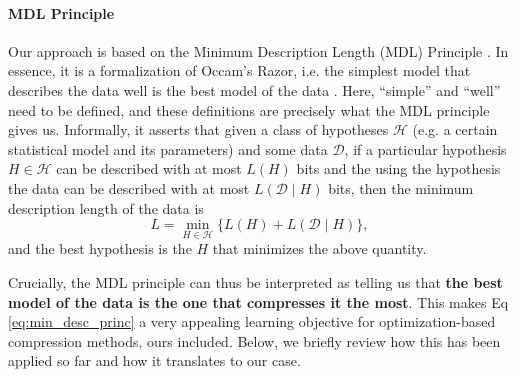 \documentclass{article}
\newcommand{\Hypos}{\mathcal{H}}
\newcommand{\Data}{\mathcal{D}}
\begin{document}
\paragraph{MDL Principle} 
Our approach is based on the Minimum Description Length (MDL) Principle
\cite{rissanen1986stochastic}. In essence, it is a formalization of Occam's
Razor, i.e. the simplest model that describes the data well is the best model of
the data \cite{grünwald2007minimum}. Here, ``simple'' and ``well'' need to be
defined, and these definitions are precisely what the MDL principle gives us.
Informally, it asserts that given a class of hypotheses $\Hypos$ (e.g. a certain
statistical model and its parameters) and some data $\Data$, if a particular
hypothesis $H \in \Hypos$ can be described with at most $L(H)$ bits and the using the
hypothesis the data can be described with at most $L(\Data \mid H)$ bits, then the
minimum description length of the data is
\begin{equation}
\label{eq:min_desc_princ}
  L = \min_{H \in \Hypos}\{ L(H) + L(\Data \mid H) \},
\end{equation}
and the best hypothesis is the $H$ that minimizes the above quantity.
\par
Crucially, the MDL principle can thus be interpreted as telling us that
\textbf{the best model of the data is the one that compresses it the most}.
This makes Eq \ref{eq:min_desc_princ} a very appealing learning objective for
optimization-based compression methods, ours included.
Below, we briefly review how this has been applied so far and how it translates
to our case.
\end{document}
